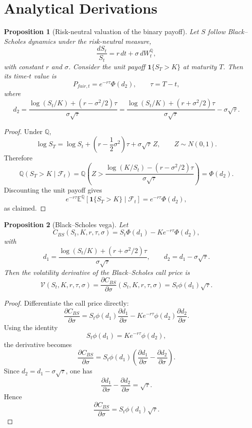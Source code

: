 \documentclass[11pt]{article}
\numberwithin{equation}{section}
\theoremstyle{plain}
\newtheorem{proposition}{Proposition}[section]
\begin{document}
\appendix

\section{Analytical Derivations}

\begin{proposition}[Risk-neutral valuation of the binary payoff]
\label{prop:digital-price}
Let $S$ follow Black--Scholes dynamics under the risk-neutral measure,
\[
\frac{dS_t}{S_t}=r\,dt+\sigma\,dW_t^{\mathbb{Q}},
\]
with constant $r$ and $\sigma$. Consider the unit payoff $\mathbf{1}\{S_T>K\}$ at maturity $T$. Then its time-$t$ value is
\[
P_{fair,t}=e^{-r\tau}\Phi(d_2),
\qquad
\tau=T-t,
\]
where
\[
d_2=\frac{\log(S_t/K)+(r-\sigma^2/2)\tau}{\sigma\sqrt{\tau}}
=
\frac{\log(S_t/K)+(r+\sigma^2/2)\tau}{\sigma\sqrt{\tau}}-\sigma\sqrt{\tau}.
\]
\end{proposition}

\begin{proof}
Under $\mathbb{Q}$,
\[
\log S_T
=
\log S_t+\left(r-\frac{1}{2}\sigma^2\right)\tau+\sigma\sqrt{\tau}\,Z,
\qquad
Z\sim N(0,1).
\]
Therefore
\[
\mathbb{Q}(S_T>K\mid\mathcal{F}_t)
=
\mathbb{Q}\!\left(
Z>
\frac{\log(K/S_t)-\left(r-\sigma^2/2\right)\tau}{\sigma\sqrt{\tau}}
\right)
=
\Phi(d_2).
\]
Discounting the unit payoff gives
\[
e^{-r\tau}\mathbb{E}^{\mathbb{Q}}\!\left[\mathbf{1}\{S_T>K\}\mid\mathcal{F}_t\right]
=
e^{-r\tau}\Phi(d_2),
\]
as claimed.
\end{proof}

\begin{proposition}[Black--Scholes vega]
\label{prop:vega-formula}
Let
\[
C_{BS}(S_t,K,r,\tau,\sigma)=S_t\Phi(d_1)-Ke^{-r\tau}\Phi(d_2),
\]
with
\[
d_1=\frac{\log(S_t/K)+(r+\sigma^2/2)\tau}{\sigma\sqrt{\tau}},
\qquad
d_2=d_1-\sigma\sqrt{\tau}.
\]
Then the volatility derivative of the Black--Scholes call price is
\[
\mathcal{V}(S_t,K,r,\tau,\sigma)
=
\frac{\partial C_{BS}}{\partial \sigma}(S_t,K,r,\tau,\sigma)
=
S_t\phi(d_1)\sqrt{\tau}.
\]
\end{proposition}

\begin{proof}
Differentiate the call price directly:
\[
\frac{\partial C_{BS}}{\partial \sigma}
=
S_t\phi(d_1)\frac{\partial d_1}{\partial \sigma}
-Ke^{-r\tau}\phi(d_2)\frac{\partial d_2}{\partial \sigma}.
\]
Using the identity
\[
S_t\phi(d_1)=Ke^{-r\tau}\phi(d_2),
\]
the derivative becomes
\[
\frac{\partial C_{BS}}{\partial \sigma}
=
S_t\phi(d_1)\left(\frac{\partial d_1}{\partial \sigma}-\frac{\partial d_2}{\partial \sigma}\right).
\]
Since $d_2=d_1-\sigma\sqrt{\tau}$, one has
\[
\frac{\partial d_1}{\partial \sigma}-\frac{\partial d_2}{\partial \sigma}=\sqrt{\tau}.
\]
Hence
\[
\frac{\partial C_{BS}}{\partial \sigma}=S_t\phi(d_1)\sqrt{\tau}.
\]
\end{proof}
\end{document}
